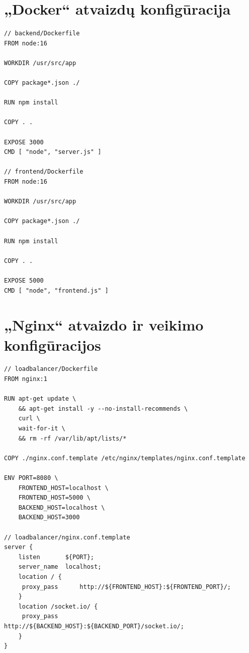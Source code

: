 \documentclass{VUMIFPSkursinis}
\begin{document}
\section{„Docker“ atvaizdų konfigūracija}
\label{priedas3}
\begin{verbatim}
// backend/Dockerfile
FROM node:16

WORKDIR /usr/src/app

COPY package*.json ./

RUN npm install

COPY . .

EXPOSE 3000
CMD [ "node", "server.js" ]

// frontend/Dockerfile
FROM node:16

WORKDIR /usr/src/app

COPY package*.json ./

RUN npm install

COPY . .

EXPOSE 5000
CMD [ "node", "frontend.js" ]
\end{verbatim}

\section{„Nginx“ atvaizdo ir veikimo konfigūracijos}
\label{priedas4}
\begin{verbatim}
// loadbalancer/Dockerfile
FROM nginx:1

RUN apt-get update \
    && apt-get install -y --no-install-recommends \
    curl \
    wait-for-it \
    && rm -rf /var/lib/apt/lists/*

COPY ./nginx.conf.template /etc/nginx/templates/nginx.conf.template

ENV PORT=8080 \
    FRONTEND_HOST=localhost \
    FRONTEND_HOST=5000 \
    BACKEND_HOST=localhost \
    BACKEND_HOST=3000

// loadbalancer/nginx.conf.template
server {
    listen       ${PORT};
    server_name  localhost;
    location / {
     proxy_pass      http://${FRONTEND_HOST}:${FRONTEND_PORT}/;
    }
    location /socket.io/ {
     proxy_pass      http://${BACKEND_HOST}:${BACKEND_PORT}/socket.io/;
    }
}
\end{verbatim}
\end{document}

